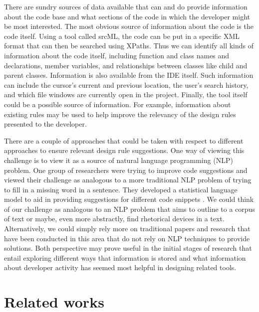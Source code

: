 \documentclass[12pt]{article}
\begin{document}
There are sundry sources of data available that can and do provide information about the code base and what sections of the code in which the developer might be most interested. The most obvious source of information about the code is the code itself. Using a tool called srcML, the code can be put in a specific XML format that can then be searched using XPaths. Thus we can identify all kinds of information about the code itself, including function and class names and declarations, member variables, and relationships between classes like child and parent classes. Information is also available from the IDE itself. Such information can include the cursor's current and previous location, the user's search history, and which file windows are currently open in the project. Finally, the tool itself could be a possible source of information. For example, information about existing rules may be used to help improve the relevancy of the design rules presented to the developer.

There are a couple of approaches that could be taken with respect to different approaches to ensure relevant design rule suggestions. One way of viewing this challenge is to view it as a source of natural language programming (NLP) problem. One group of researchers were trying to improve code suggestions and viewed their challenge as analogous to a more traditional NLP problem of trying to fill in a missing word in a sentence. They developed a statistical language model to aid in providing suggestions for different code snippets \cite{RaychevEtAl2014}. We could think of our challenge as analogous to an NLP problem that aims to outline to a corpus of text or maybe, even more abstractly, find rhetorical devices in a text. Alternatively, we could simply rely more on traditional papers and research that have been conducted in this area that do not rely on NLP techniques to provide solutions. Both perspective may prove useful in the initial stages of research that entail exploring different ways that information is stored and what information about developer activity has seemed most helpful in designing related tools. 





\clearpage


\section{Related works}\label{relatedWorks}
\end{document}

